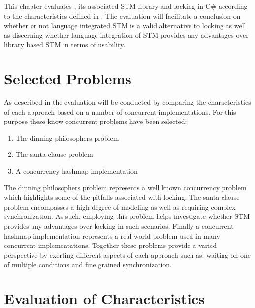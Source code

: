 \makeatletter {}\makeatother
{}
This chapter evaluates \stmnamesp, its associated \ac{STM} library and locking in C\# according to the characteristics defined in \cite[p. 15-21]{dpt907e14trending}. The evaluation will facilitate a conclusion on whether or not language integrated \ac{STM} is a valid alternative to locking as well as discerning whether language integration of \ac{STM} provides any advantages over library based \ac{STM} in terms of usability.
\label{chap:evaluation}
\section{Selected Problems}
As described in  the evaluation will be conducted by comparing the characteristics of each approach based on a number of concurrent implementations. For this purpose these know concurrent problems have been selected:
\begin{enumerate}
\item The dinning philosophers problem\cite[p. 673]{hoare1978communicating}
\item The santa clause problem\cite{trono1994new}
\item A concurrency hashmap implementation
\end{enumerate}
The dinning philosophers problem represents a well known concurrency problem which highlights some of the pitfalls associated with locking. The santa clause problem encompasses a high degree of modeling as well as requiring complex synchronization. As such, employing this problem helps investigate whether \ac{STM} provides any advantages over locking in such scenarios. Finally a concurrent hashmap implementation represents a real world problem used in many concurrent implementations. Together these problems provide a varied perspective by exerting different aspects of each approach such as: waiting on one of multiple conditions and fine grained synchronization.
\section{Evaluation of Characteristics}

\worksheetend
